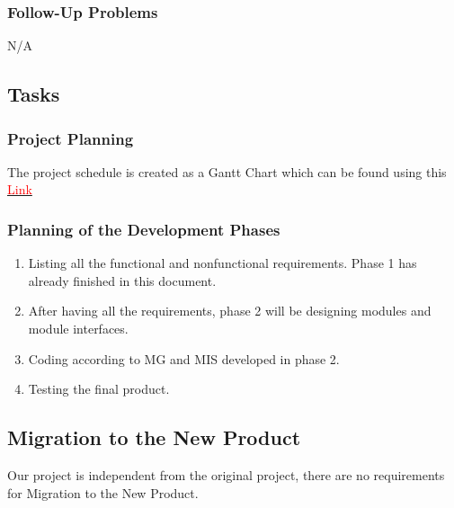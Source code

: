 \documentclass[12pt]{article}
\begin{document}
\subsubsection{Follow-Up Problems}
N/A
\subsection{Tasks}
\subsubsection{Project Planning}
The project schedule is created as a Gantt Chart which can
be found using this \href{https://gitlab.cas.mcmaster.ca/shit19/2022_winter_3xa3_l03_g07/-/tree/main/ProjectSchedule}{\textcolor{red}{Link}}
\subsubsection{Planning of the Development Phases}
\begin{enumerate}[{Phase}1:]
\item Listing all the functional and nonfunctional requirements. Phase 1 has already finished in this document.
\item After having all the requirements, phase 2 will be
designing modules and module interfaces.
\item Coding according to MG and MIS developed in phase 2.
\item Testing the final product.
\end{enumerate}
\subsection{Migration to the New Product}
Our project is independent from the original project, there 
are no requirements for Migration to the New Product.
\end{document}
